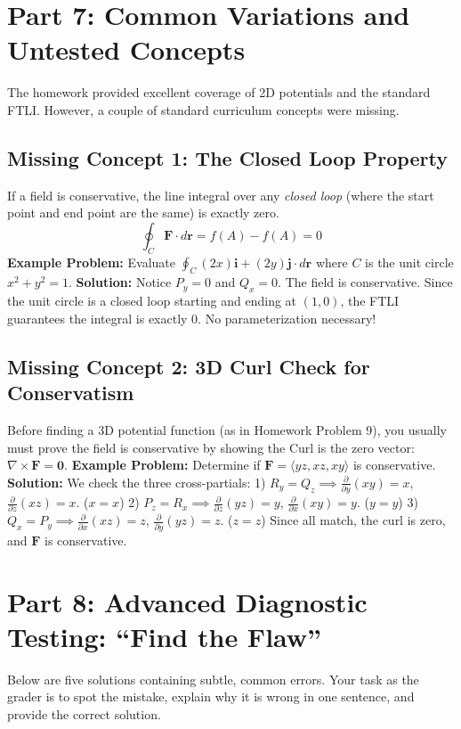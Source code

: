 \documentclass[12pt]{article}
\begin{document}
\newpage
\section{Part 7: Common Variations and Untested Concepts}

The homework provided excellent coverage of 2D potentials and the standard FTLI. However, a couple of standard curriculum concepts were missing.

\subsection{Missing Concept 1: The Closed Loop Property}
If a field is conservative, the line integral over any \textit{closed loop} (where the start point and end point are the same) is exactly zero.
\[
\oint_C \mathbf{F} \cdot d\mathbf{r} = f(A) - f(A) = 0
\]
\textbf{Example Problem:} Evaluate $\oint_C (2x)\mathbf{i} + (2y)\mathbf{j} \cdot d\mathbf{r}$ where $C$ is the unit circle $x^2 + y^2 = 1$.
\textbf{Solution:} Notice $P_y = 0$ and $Q_x = 0$. The field is conservative. Since the unit circle is a closed loop starting and ending at $(1,0)$, the FTLI guarantees the integral is exactly $0$. No parameterization necessary!

\subsection{Missing Concept 2: 3D Curl Check for Conservatism}
Before finding a 3D potential function (as in Homework Problem 9), you usually must prove the field is conservative by showing the Curl is the zero vector: $\nabla \times \mathbf{F} = \mathbf{0}$.
\textbf{Example Problem:} Determine if $\mathbf{F} = \langle yz, xz, xy \rangle$ is conservative.
\textbf{Solution:} We check the three cross-partials:
1) $R_y = Q_z \implies \frac{\partial}{\partial y}(xy) = x$, $\frac{\partial}{\partial z}(xz) = x$. ($x = x$)
2) $P_z = R_x \implies \frac{\partial}{\partial z}(yz) = y$, $\frac{\partial}{\partial x}(xy) = y$. ($y = y$)
3) $Q_x = P_y \implies \frac{\partial}{\partial x}(xz) = z$, $\frac{\partial}{\partial y}(yz) = z$. ($z = z$)
Since all match, the curl is zero, and $\mathbf{F}$ is conservative.

\newpage
\section{Part 8: Advanced Diagnostic Testing: ``Find the Flaw''}

Below are five solutions containing subtle, common errors. Your task as the grader is to spot the mistake, explain why it is wrong in one sentence, and provide the correct solution.
\end{document}
